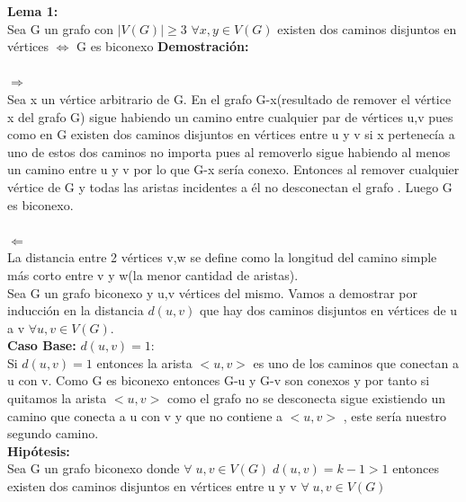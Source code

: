 \documentclass{article}
\begin{document}
    \noindent \textbf{Lema 1:}\\
    Sea G un grafo con $|V(G)|\ge 3$ $\forall x,y\in V(G)$ existen dos caminos disjuntos en v\'ertices $\Longleftrightarrow$ G es biconexo \newline
    \newline
    \noindent \textbf{Demostraci\'on:}\\\\
    $\Longrightarrow$\\
    Sea x un v\'ertice arbitrario de G. En el grafo G-x(resultado de remover el v\'ertice x del grafo G)
    sigue habiendo un camino entre cualquier par de v\'ertices u,v pues como en G existen dos caminos disjuntos en v\'ertices
    entre u y v si x pertenec\'ia a uno de estos dos caminos no importa pues al removerlo sigue habiendo al menos un camino 
    entre u y v por lo que G-x ser\'ia conexo. Entonces al remover cualquier v\'ertice de G y todas las aristas incidentes a
    \'el no desconectan el grafo . Luego G es biconexo.\\\\
    $\Longleftarrow$\\
    La distancia entre 2 v\'ertices v,w se define como la longitud del camino simple m\'as corto entre v y w(la menor
    cantidad de aristas).\\
    Sea G un grafo biconexo y u,v v\'ertices del mismo. Vamos a demostrar por inducci\'on en la distancia $d(u,v)$ que hay
    dos caminos disjuntos en v\'ertices de u a v $\forall u,v \in V(G)$.\\
    \newline
    \noindent \textbf{Caso Base:} $d(u,v)=1$:\\
    Si $d(u,v)=1$ entonces la arista $<u,v>$ es uno de los caminos que conectan a u con v. Como G es biconexo entonces 
    G-u y G-v son conexos y por tanto si quitamos la  arista $<u,v>$  como el grafo no se desconecta sigue existiendo
    un camino que conecta a u con v y que no contiene a $<u,v>$ , este ser\'ia nuestro segundo camino.\\

    \noindent \textbf{Hip\'otesis:}\\
    Sea G un grafo biconexo donde $\forall\; u,v\in V(G)\; d(u,v)=k-1>1$ entonces existen dos caminos 
    disjuntos en v\'ertices entre u y v $\forall\; u,v\in V(G)\;$\\
\end{document}
